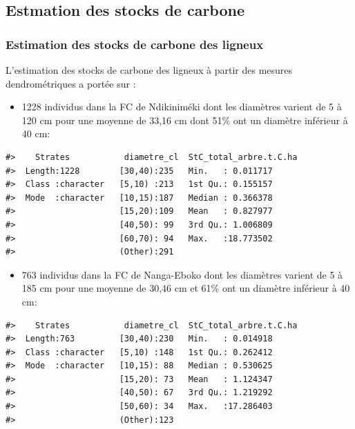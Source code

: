 \documentclass[
  12pt,
  a4paper,
  extrafontsizes,
  onecolumn,
  openright]{book}
\providecommand{\tightlist}{%
  \setlength{\itemsep}{0pt}\setlength{\parskip}{0pt}}
\theoremstyle{definition}
\theoremstyle{definition}
\theoremstyle{definition}
\theoremstyle{definition}
\theoremstyle{remark}
\begin{document}
\hypertarget{estmation-des-stocks-de-carbone}{%
\subsection{Estmation des stocks de carbone}\label{estmation-des-stocks-de-carbone}}

\hypertarget{estimation-des-stocks-de-carbone-des-ligneux}{%
\subsubsection{Estimation des stocks de carbone des ligneux}\label{estimation-des-stocks-de-carbone-des-ligneux}}

L'estimation des stocks de carbone des ligneux à partir des mesures dendrométriques a portée sur :

\begin{itemize}
\tightlist
\item
  1228 individus dans la FC de Ndikiniméki dont les diamètres varient de 5 à 120 cm pour une moyenne de 33,16 cm dont 51\% ont un diamètre inférieur à 40 cm:
\end{itemize}

\begin{verbatim}
#>    Strates           diametre_cl  StC_total_arbre.t.C.ha
#>  Length:1228        [30,40):235   Min.   : 0.011717     
#>  Class :character   [5,10) :213   1st Qu.: 0.155157     
#>  Mode  :character   [10,15):187   Median : 0.366378     
#>                     [15,20):109   Mean   : 0.827977     
#>                     [40,50): 99   3rd Qu.: 1.006809     
#>                     [60,70): 94   Max.   :18.773502     
#>                     (Other):291
\end{verbatim}

\begin{itemize}
\tightlist
\item
  763 individus dans la FC de Nanga-Eboko dont les diamètres varient de 5 à 185 cm pour une moyenne de 30,46 cm et 61\% ont un diamètre inférieur à 40 cm:
\end{itemize}

\begin{verbatim}
#>    Strates           diametre_cl  StC_total_arbre.t.C.ha
#>  Length:763         [30,40):230   Min.   : 0.014918     
#>  Class :character   [5,10) :148   1st Qu.: 0.262412     
#>  Mode  :character   [10,15): 88   Median : 0.530625     
#>                     [15,20): 73   Mean   : 1.124347     
#>                     [40,50): 67   3rd Qu.: 1.219292     
#>                     [50,60): 34   Max.   :17.286403     
#>                     (Other):123
\end{verbatim}
\end{document}
